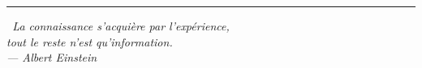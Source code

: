 \vspace{2em}
\begin{center}
\rule{0.5\textwidth}{0.5pt}
\end{center}
\vspace{1em}

\begin{tcolorbox}[
  colback=bleuMaitreLight, colframe=bleuMaitre,
  width=0.9\textwidth, center
]
\centering\itshape
\guillemotleft\, La connaissance s'acqui\`ere par l'exp\'erience,\\
tout le reste n'est qu'information.\,\guillemotright\\[4pt]
{\normalsize --- Albert Einstein}
\end{tcolorbox}